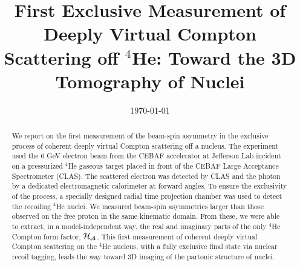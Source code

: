 \documentclass[twocolumn,nofootinbib,showpacs,prl,superscriptaddress,secnumarabic,amssymb,nobibnotes,aps,floatfix]{revtex4}
\begin{document}
\linenumbers

\title{First Exclusive Measurement of Deeply Virtual Compton Scattering off $^4$He: Toward the 3D Tomography of Nuclei}


%
\date{\today}
\begin{abstract}
We report on the first measurement of the beam-spin asymmetry in the exclusive 
process of coherent deeply virtual Compton scattering off a nucleus. The 
experiment used the 6 GeV electron beam from the CEBAF accelerator at Jefferson 
Lab incident on a pressurized $^4$He gaseous target placed in front of the CEBAF Large Acceptance 
Spectrometer (CLAS). The scattered electron was detected by CLAS and the photon 
by a dedicated electromagnetic calorimeter at forward angles. To ensure the 
exclusivity of the process, a specially designed radial time projection chamber 
was used to detect the recoiling $^4$He nuclei. We measured beam-spin 
asymmetries larger than those observed on the free proton in the same kinematic 
domain. From these, we were able to extract, in a model-independent way, the 
real and imaginary parts of the only $^4$He Compton form factor, $\cal H_A$. 
This first measurement of coherent deeply virtual Compton scattering on 
the $^4$He nucleus, with a fully exclusive final state via nuclear recoil 
tagging, leads the way toward 3D imaging of the partonic structure of nuclei.
\end{abstract}

\maketitle 
\end{document}

